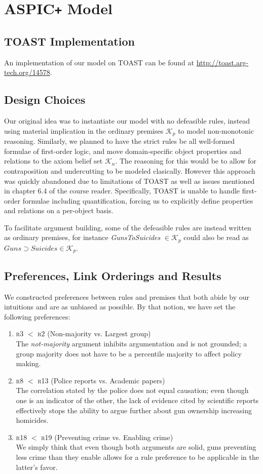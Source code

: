 \documentclass[]{article}
\begin{document}
\section{ASPIC\texttt{+} Model}\label{sec3}
\subsection{TOAST Implementation}
An implementation of our model on TOAST\cite{TOAST} can be found at \url{http://toast.arg-tech.org/14578}.
\subsection{Design Choices}
Our original idea was to instantiate our model with no defeasible rules, instead using material implication in the ordinary premises $\mathcal{K}_p$ to model non-monotonic reasoning. Similarly, we planned to have the strict rules be all well-formed formulae of first-order logic, and move domain-specific object properties and relations to the axiom belief set $\mathcal{K}_n$. The reasoning for this would be to allow for contraposition and undercutting to be modeled clasically. However this approach was quickly abandoned due to limitations of TOAST as well as issues mentioned in chapter 6.4 of the course reader. Specifically, TOAST is unable to handle first-order formulae including quantification, forcing us to explicitly define properties and relations on a per-object basis.

To facilitate argument building, some of the defeasible rules are instead written as ordinary premises, for instance \textit{GunsToSuicides} $\in \mathcal{K}_p$ could also be read as $Guns \supset Suicides \in \mathcal{K}_p$.
\subsection{Preferences, Link Orderings and Results}
We constructed preferences between rules and premises that both abide by our intuitions and are as unbiased as possible. By that notion, we have set the following preferences:
\begin{enumerate}
\item \textsc{r3} $<$ \textsc{r2} (Non-majority vs. Largest group)\\
The \textit{not-majority} argument inhibits argumentation and is not grounded; a group majority does not have to be a percentile majority to affect policy making.
\item \textsc{r8} $<$ \textsc{r13} (Police reports vs. Academic papers)\\
The correlation stated by the police does not equal causation; even though one is an indicator of the other, the lack of evidence cited by scientific reports effectively stops the ability to argue further about gun ownership increasing homicides.
\item \textsc{r18} $<$ \textsc{r19} (Preventing crime vs. Enabling crime)\\
We simply think that even though both arguments are solid, guns preventing less crime than they enable allows for a rule preference to be applicable in the latter's favor.
\end{enumerate}
\end{document}
